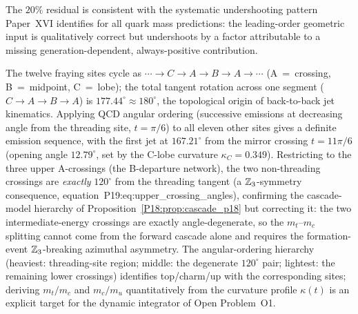 \begin{remark}
\label{P19:rem:triplet_deviation}
The $20\%$ residual is consistent with the systematic undershooting
pattern Paper~XVI identifies for all quark mass predictions: the
leading-order geometric input is qualitatively correct but undershoots
by a factor attributable to a missing generation-dependent,
always-positive contribution.
\end{remark}

\begin{remark}
\label{P19:rem:angular_ordering}
The twelve fraying sites cycle as $\cdots\to C\to A\to B\to A\to\cdots$
(A~=~crossing, B~=~midpoint, C~=~lobe); the total tangent rotation
across one segment ($C\to A\to B\to A$) is $177.44^\circ\approx180^\circ$,
the topological origin of back-to-back jet kinematics. Applying QCD
angular ordering (successive emissions at decreasing angle from the
threading site, $t=\pi/6$) to all eleven other sites gives a definite
emission sequence, with the first jet at $167.21^\circ$ from the
mirror crossing $t=11\pi/6$ (opening angle $12.79^\circ$, set by the
C-lobe curvature $\kappa_C=0.349$). Restricting to the three upper
A-crossings (the B-departure network), the two non-threading
crossings are \emph{exactly} $120^\circ$ from the threading tangent
(a $\mathbb{Z}_3$-symmetry consequence, equation~P19:eq:upper\_crossing\_angles),
confirming the cascade-model hierarchy of
Proposition~\ref{P18:prop:cascade_p18} but correcting it: the two
intermediate-energy crossings are exactly angle-degenerate, so the
$m_t$--$m_c$ splitting cannot come from the forward cascade alone and
requires the formation-event $\mathbb{Z}_3$-breaking azimuthal asymmetry.
The angular-ordering hierarchy (heaviest: threading-site region;
middle: the degenerate $120^\circ$ pair; lightest: the remaining lower
crossings) identifies top/charm/up with the corresponding sites;
deriving $m_t/m_c$ and $m_c/m_u$ quantitatively from the curvature
profile $\kappa(t)$ is an explicit target for the dynamic integrator
of Open Problem~O1.
\end{remark}

